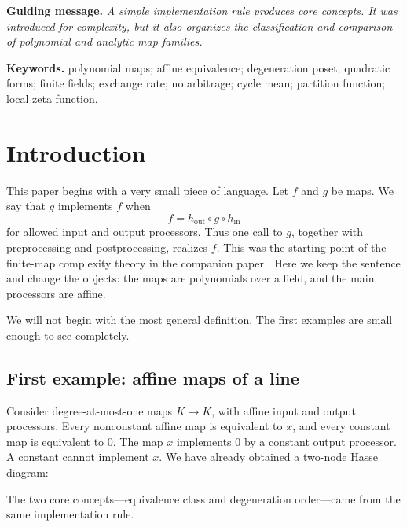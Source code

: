\documentclass[11pt]{article}
\theoremstyle{definition}
\theoremstyle{plain}
\theoremstyle{remark}
\begin{document}
\begin{abstract}
The final sections are an outlook.  The Euler product is an exact joint
partition function of prime occupation modes for real \(s>1\), but the
nontrivial zeros lie outside this ordinary Gibbs regime.  Weil's Hermitian
matrix \(E\) and the directed operational matrix \(M\) presently have no
proved bridge.  The paper therefore offers a simple route to core concepts
and a concrete research program, not a claimed connection to the Riemann
hypothesis.
\end{abstract}

\medskip
\noindent\textbf{Guiding message.}
\emph{A simple implementation rule produces core concepts.  It was introduced
for complexity, but it also organizes the classification and comparison of
polynomial and analytic map families.}

\medskip
\noindent\textbf{Keywords.} polynomial maps; affine equivalence; degeneration
poset; quadratic forms; finite fields; exchange rate; no arbitrage; cycle mean;
partition function; local zeta function.

\section{Introduction}

This paper begins with a very small piece of language.  Let \(f\) and \(g\)
be maps.  We say that \(g\) implements \(f\) when
\begin{equation}
  f=h_{\mathrm{out}}\circ g\circ h_{\mathrm{in}}
  \label{eq:implementation-intro}
\end{equation}
for allowed input and output processors.  Thus one call to \(g\), together
with preprocessing and postprocessing, realizes \(f\).  This was the starting
point of the finite-map complexity theory in the companion paper
\cite{vorozhtsov-exchange}.  Here we keep the sentence and change the objects:
the maps are polynomials over a field, and the main processors are affine.

We will not begin with the most general definition.  The first examples are
small enough to see completely.

\subsection*{First example: affine maps of a line}

Consider degree-at-most-one maps \(K\to K\), with affine input and output
processors.  Every nonconstant affine map is equivalent to \(x\), and every
constant map is equivalent to \(0\).  The map \(x\) implements \(0\) by a
constant output processor.  A constant cannot implement \(x\).  We have
already obtained a two-node Hasse diagram:
\begin{center}
\end{center}
The two core concepts---equivalence class and degeneration order---came from
the same implementation rule.
\end{document}
